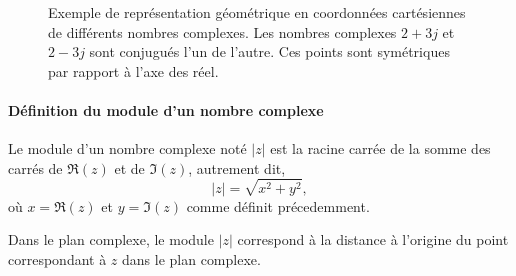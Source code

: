 \begin{figure}[!h]
\captionsetup{width=0.8\linewidth}
\begin{center}
\end{center}
    \caption{Exemple de représentation géométrique en coordonnées cartésiennes 
    de différents nombres complexes. Les nombres complexes $2+3j$ et $2-3j$
    sont conjugués l'un de l'autre. Ces points sont symétriques par rapport à l'axe des réel.
   \label{fig-plan_complexe}}
\end{figure}

\paragraph{Définition du module d'un nombre complexe}
Le module d'un nombre complexe noté $|z|$ est la 
racine carrée de la somme des carrés de $\Re(z)$ et de $\Im(z)$, 
autrement dit, 
$$
|z|=\sqrt{x^2+y^2},
$$
où $x=\Re(z)$ et $y=\Im(z)$ comme définit précedemment.

Dans le plan complexe, le module $|z|$ correspond à la distance à l'origine du 
point correspondant à $z$ dans le plan complexe.


